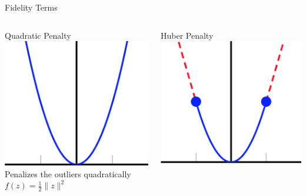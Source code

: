 \documentclass[12pt]{beamer}
\begin{document}
\begin{frame}{Fidelity Terms}
	\begin{columns}[T]
		\begin{column}{0.35\linewidth}
			\begin{block}{Quadratic Penalty}
				\quad 
				\includegraphics[scale=0.1]{../figures/quadratic} \\
				{\footnotesize Penalizes the outliers quadratically} \\[1ex]
				\hspace{3em} $f(z) = \frac{1}{2}\lVert z\rVert^2$
			\end{block}
		\end{column}
		\begin{column}{0.50\linewidth}
			\begin{block}{Huber Penalty}
				\quad 
				\includegraphics[scale=0.1]{../figures/huber} \\

\end{block}
\end{column}
\end{columns}
\end{frame}
\end{document}
